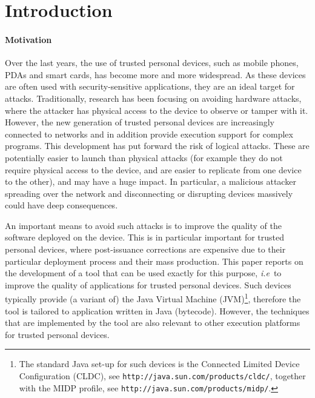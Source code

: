 \section{Introduction}\label{SecIntro}

\paragraph{Motivation}
Over the last years, the use of trusted personal devices, such as
mobile phones, PDAs and smart cards, has become more and more
widespread. As these devices are often used with security-sensitive
applications, they are an ideal target for attacks. Traditionally,
research has been focusing on avoiding hardware attacks, where the
attacker has physical access to the device to observe or tamper with
it. However, the new generation of trusted personal devices are
increasingly connected to networks and in addition provide execution
support for complex programs. This development has put forward the
risk of logical attacks. These are potentially easier to launch than
physical attacks (for example they do not require physical access to
the device, and are easier to replicate from one device to the other),
and may have a huge impact.  In particular, a malicious attacker
spreading over the network and disconnecting or disrupting devices
massively could have deep consequences. 

An important means to avoid such attacks is to improve the quality of
the software deployed on the device. This is in particular important
for trusted personal devices, where post-issuance corrections are
expensive due to their particular deployment process and their mass
production. This paper reports on the development of a tool that can
be used exactly for this purpose, \emph{i.e}\ to improve the quality
of applications for trusted personal devices. Such devices typically
provide (a variant of) the Java Virtual Machine (JVM)\footnote{The
standard Java set-up for such devices is the Connected Limited
Device Configuration (CLDC), see
\texttt{http://java.sun.com/products/cldc/},
together with the MIDP profile, see
\texttt{http://java.sun.com/products/midp/}.}, 
therefore the tool is tailored to application written in Java
(bytecode). However, the techniques that are implemented by the tool
are also relevant to other execution platforms for trusted personal
devices.



